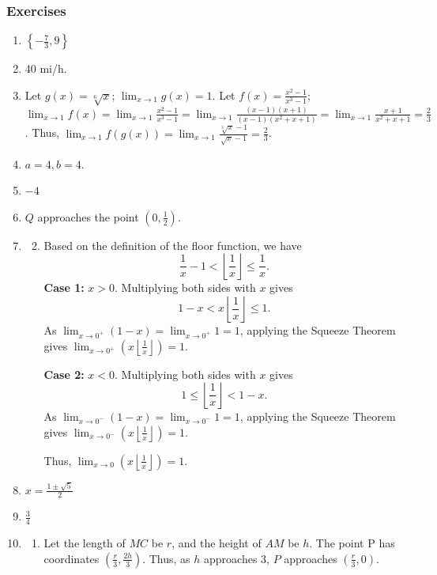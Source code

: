 \documentclass{article}
\begin{document}
\subsubsection*{Exercises}
\begin{enumerate}
  \item $\left\{-\frac{7}{3}, 9\right\}$
        \setcounter{enumi}{8}
  \item 40 mi/h.
        \setcounter{enumi}{14}
  \item Let $g(x) = \sqrt[6]{x}$; $\lim_{x\to1}g(x)=1$. Let $f(x)=\frac{x^2-1}{x^3-1}$;
        $\lim_{x\to1}f(x)=\lim_{x\to1}\frac{x^2-1}{x^3-1}=\lim_{x\to1}\frac{(x-1)(x+1)}
          {(x-1)(x^2+x+1)}=\lim_{x\to1}\frac{x+1}{x^2+x+1}=\frac{2}{3}$. Thus, $\lim_{x\to1}
          f(g(x))=\lim_{x\to1}\frac{\sqrt[3]{x}-1}{\sqrt{x}-1}=\frac{2}{3}$.
  \item $a=4, b=4$.
  \item $-4$
  \item $Q$ approaches the point $(0, \frac{1}{2})$.
  \item \begin{enumerate}
          \setcounter{enumii}{1}
          \item Based on the definition of the floor function, we have
                \[\frac{1}{x}-1 < \left\lfloor\frac{1}{x}\right\rfloor \le \frac{1}{x}.\]
                \textbf{Case 1:} $x>0$. Multiplying both sides with $x$ gives
                \[1-x < x\left\lfloor\frac{1}{x}\right\rfloor \le 1.\]
                As $\lim_{x\to0^+}(1-x) = \lim_{x\to0^+}1 = 1$, applying the Squeeze Theorem gives
                $\lim_{x\to0^+}\left(x\left\lfloor\frac{1}{x}\right\rfloor\right)=1$.

                \textbf{Case 2:} $x<0$. Multiplying both sides with $x$ gives
                \[1\le\left\lfloor\frac{1}{x}\right\rfloor<1-x.\]
                As $\lim_{x\to0^-}(1-x) = \lim_{x\to0^-}1 = 1$, applying the Squeeze Theorem gives
                $\lim_{x\to0^-}\left(x\left\lfloor\frac{1}{x}\right\rfloor\right)=1$.

                Thus, $\lim_{x\to0}\left(x\left\lfloor\frac{1}{x}\right\rfloor\right)=1$.
        \end{enumerate}
        \setcounter{enumi}{20}
  \item $x=\frac{1\pm\sqrt{5}}{2}$
        \setcounter{enumi}{22}
  \item $\frac{3}{4}$
  \item \begin{enumerate}
          \item Let the length of $MC$ be $r$, and the height of $AM$ be $h$. The point P has
                coordinates $(\frac{r}{3}, \frac{2h}{3})$. Thus, as $h$ approaches 3, $P$ approaches
                $(\frac{r}{3}, 0)$.
        \end{enumerate}
\end{enumerate}
\end{document}
